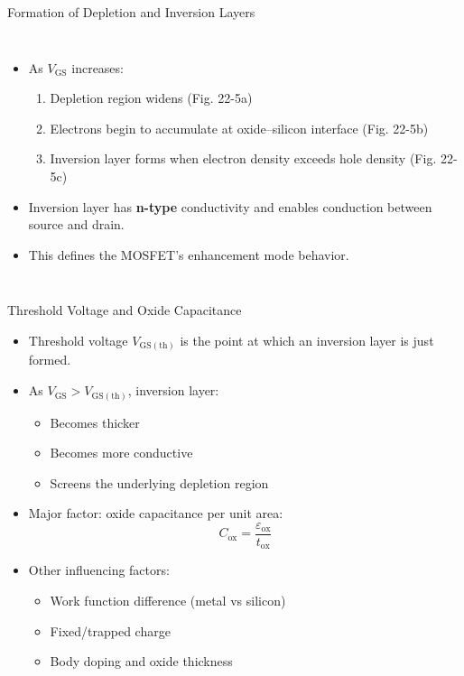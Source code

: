\begin{frame}{Formation of Depletion and Inversion Layers}
\begin{columns}
\begin{itemize}
    \item As $V_{\mathrm{GS}}$ increases:
    \begin{enumerate}
        \item Depletion region widens (Fig. 22-5a)
        \item Electrons begin to accumulate at oxide–silicon interface (Fig. 22-5b)
        \item Inversion layer forms when electron density exceeds hole density (Fig. 22-5c)
    \end{enumerate}
    \item Inversion layer has \textbf{n-type} conductivity and enables conduction between source and drain.
    \item This defines the MOSFET’s enhancement mode behavior.
\end{itemize}
\end{columns}
\end{frame}


\begin{frame}{Threshold Voltage and Oxide Capacitance}
\begin{itemize}
    \item Threshold voltage $V_{\mathrm{GS(th)}}$ is the point at which an inversion layer is just formed.
    \item As $V_{\mathrm{GS}} > V_{\mathrm{GS(th)}}$, inversion layer:
    \begin{itemize}
        \item Becomes thicker
        \item Becomes more conductive
        \item Screens the underlying depletion region
    \end{itemize}
    \item Major factor: oxide capacitance per unit area:
    \[
        C_{\mathrm{ox}} = \frac{\varepsilon_{\mathrm{ox}}}{t_{\mathrm{ox}}}
    \]
    \item Other influencing factors:
    \begin{itemize}
        \item Work function difference (metal vs silicon)
        \item Fixed/trapped charge
        \item Body doping and oxide thickness
    \end{itemize}
\end{itemize}
\end{frame}

